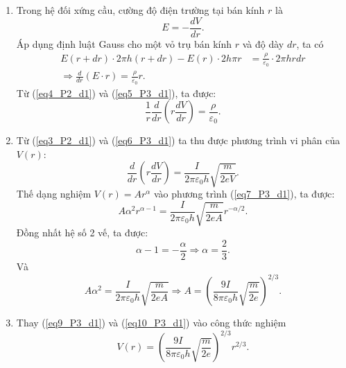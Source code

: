 \begin{enumerate}[label=\textbf{\alph*,}]
\item Trong hệ đối xứng cầu, cường độ điện trường tại bán kính $r$ là
\begin{equation} \label{eq4_P3_d1}
    E = - \frac{dV}{dr}.
\end{equation}
Áp dụng định luật Gauss cho một vỏ trụ bán kính $r$ và độ dày $dr$, ta có
\begin{equation} \label{eq5_P3_d1}
    \begin{split}
        E(r+dr) \cdot 2 \pi h (r+dr) - E(r) \cdot 2 h \pi r &= \frac{\rho}{\varepsilon_0} \cdot 2 \pi h r dr \\
        \Rightarrow \frac{d}{dr} \left( E \cdot r \right) = \frac{\rho}{\varepsilon_0} r.
    \end{split}
\end{equation}
Từ (\ref{eq4_P2_d1}) và (\ref{eq5_P3_d1}), ta được:
\begin{equation} \label{eq6_P3_d1}
    \frac{1}{r} \frac{d}{dr} \left( r \frac{dV}{dr} \right) = \frac{\rho}{\varepsilon_0}.
\end{equation}
\item Từ (\ref{eq3_P2_d1}) và (\ref{eq6_P3_d1}) ta thu được phương trình vi phân của $V(r)$:
\begin{equation} \label{eq7_P3_d1}
    \frac{d}{dr} \left( r \frac{dV}{dr} \right) = \frac{I}{2\pi \varepsilon_0 h} \sqrt{ \frac{m}{2eV} } .
\end{equation}
Thế dạng nghiệm $V(r)=Ar^\alpha$ vào phương trình (\ref{eq7_P3_d1}), ta được:
\begin{equation} \label{eq8_P3_d1}
    A \alpha^2 r^{\alpha-1} = \frac{I}{2 \pi \varepsilon_0 h} \sqrt{ \frac{m}{2e A} } r^{-\alpha/2}.
\end{equation}
Đồng nhất hệ số 2 vế, ta được:
\begin{equation} \label{eq9_P3_d1}
    \alpha-1=-\frac{\alpha}{2} \Rightarrow \alpha = \frac{2}{3}.
\end{equation}
Và 
\begin{equation} \label{eq10_P3_d1}
    A \alpha^2 = \frac{I}{2 \pi \varepsilon_0 h} \sqrt{ \frac{m}{2e A} } \Rightarrow A= \left( \frac{9I}{8\pi \varepsilon_0 h} \sqrt{\frac{m}{2e}} \right)^{2/3}.
\end{equation}
\item Thay (\ref{eq9_P3_d1}) và (\ref{eq10_P3_d1}) vào công thức nghiệm
\begin{equation} \label{eq11_P3_d1}
    V(r) = \left( \frac{9I}{8\pi \varepsilon_0 h} \sqrt{\frac{m}{2e}} \right)^{2/3} r^{2/3}.
\end{equation}

\end{enumerate}
